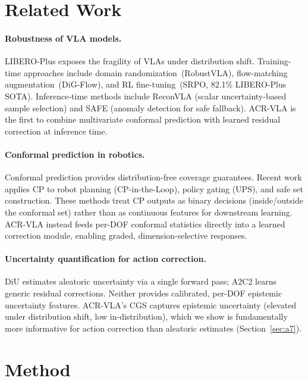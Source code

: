 \documentclass[letterpaper]{article}
\begin{document}
\section{Related Work}

\paragraph{Robustness of VLA models.}
LIBERO-Plus exposes the fragility of VLAs under distribution shift.
Training-time approaches include domain randomization~(RobustVLA), flow-matching augmentation~(DiG-Flow), and RL fine-tuning~(SRPO, 82.1\% LIBERO-Plus SOTA).
Inference-time methods include ReconVLA (scalar uncertainty-based sample selection) and SAFE (anomaly detection for safe fallback).
ACR-VLA is the first to combine multivariate conformal prediction with learned residual correction at inference time.

\paragraph{Conformal prediction in robotics.}
Conformal prediction provides distribution-free coverage guarantees.
Recent work applies CP to robot planning (CP-in-the-Loop), policy gating (UPS), and safe set construction.
These methods treat CP outputs as binary decisions (inside/outside the conformal set) rather than as continuous features for downstream learning.
ACR-VLA instead feeds per-DOF conformal statistics directly into a learned correction module, enabling graded, dimension-selective responses.

\paragraph{Uncertainty quantification for action correction.}
DiU estimates aleatoric uncertainty via a single forward pass; A2C2 learns generic residual corrections.
Neither provides calibrated, per-DOF epistemic uncertainty features.
ACR-VLA's CGS captures epistemic uncertainty (elevated under distribution shift, low in-distribution), which we show is fundamentally more informative for action correction than aleatoric estimates (Section~\ref{sec:a7}).

\section{Method}
\end{document}

